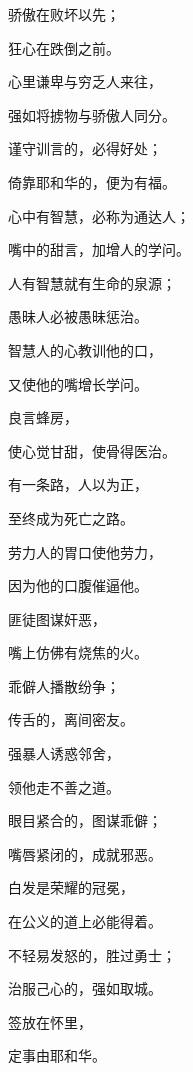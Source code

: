{\par }{\Q {}骄傲在败坏以先；
\par }{\Q 狂心在跌倒之前。
\par }{\Q {}心里谦卑与穷乏人来往，
\par }{\Q 强如将掳物与骄傲人同分。
\par }{\Q {}谨守训言的，必得好处；
\par }{\Q 倚靠耶和华的，便为有福。
\par }{\Q {}心中有智慧，必称为通达人；
\par }{\Q 嘴中的甜言，加增人的学问。
\par }{\Q {}人有智慧就有生命的泉源；
\par }{\Q 愚昧人必被愚昧惩治。
\par }{\Q {}智慧人的心教训他的口，
\par }{\Q 又使他的嘴增长学问。
\par }{\Q {}良言{}蜂房，
\par }{\Q 使心觉甘甜，使骨得医治。
\par }{\Q {}有一条路，人以为正，
\par }{\Q 至终成为死亡之路。
\par }{\Q {}劳力人的胃口使他劳力，
\par }{\Q 因为他的口腹催逼他。
\par }{\Q {}匪徒图谋奸恶，
\par }{\Q 嘴上仿佛有烧焦的火。
\par }{\Q {}乖僻人播散纷争；
\par }{\Q 传舌的，离间密友。
\par }{\Q {}强暴人诱惑邻舍，
\par }{\Q 领他走不善之道。
\par }{\Q {}眼目紧合的，图谋乖僻；
\par }{\Q 嘴唇紧闭的，成就邪恶。
\par }{\Q {}白发是荣耀的冠冕，
\par }{\Q 在公义的道上必能得着。
\par }{\Q {}不轻易发怒的，胜过勇士；
\par }{\Q 治服己心的，强如取城。
\par }{\Q {}签放在怀里，
\par }{\Q 定事由耶和华。

}

